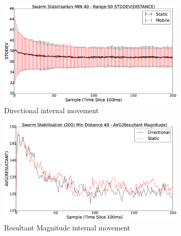\documentclass[10pt,journal,letterpaper,twoside]{IEEEtran}
\newcommand{\stability}{internal movement}
\begin{document}
\begin{figure}[H]
\begin{center}
\includegraphics[width=9cm]{figures/StabilityDistanceSwarmDirection}
\end{center}
\caption{Directional \stability{}\label{methods:StabilityDistanceSwarmDirection}}
\end{figure}

\begin{figure}[H]
\begin{center}
\includegraphics[width=9cm]{figures/StabilityDistanceSwarmDirectionAVGMAG}
\end{center}
\caption{Resultant Magnitude \stability{}\label{methods:StabilityDistanceSwarmDirectionAVGMAG}}
\end{figure}




\end{document}
